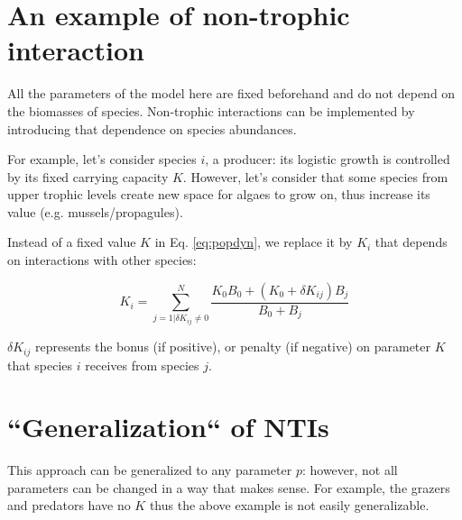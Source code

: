 \documentclass[a4paper,11pt]{article}
\begin{document}
  
  \section{An example of non-trophic interaction}
    All the parameters of the model here are fixed beforehand and do not depend 
on the biomasses of species. Non-trophic interactions can be implemented by 
introducing that dependence on species abundances.
    
    For example, let's consider species $i$, a producer: its logistic growth is 
controlled by its fixed carrying capacity $K$. However, let's consider that some 
species from upper trophic levels create new space for algaes to grow on, thus 
increase its value (e.g. mussels/propagules). 
    
    Instead of a fixed value $K$ in Eq. \ref{eq:popdyn}, we replace it by 
$K_{i}$ that depends on interactions with other species: 
    
    \begin{equation}
      K_{i} = \sum_{j=1|\delta K_{ij}\neq0}^{N} \frac{ K_0 B_0 + (K_0 + \delta K_{ij}) B_j }{ B_0 + B_j }
    \end{equation}
    
    $\delta K_{ij}$ represents the bonus (if positive), or penalty (if negative) 
on parameter $K$ that species $i$ receives from species $j$. 
    
  
  \section{``Generalization`` of NTIs}
    This approach can be generalized to any parameter $p$: however, not all 
parameters can be changed in a way that makes sense. For example, the 
grazers and predators have no $K$ thus the above example is not easily 
generalizable.
    
\end{document}
